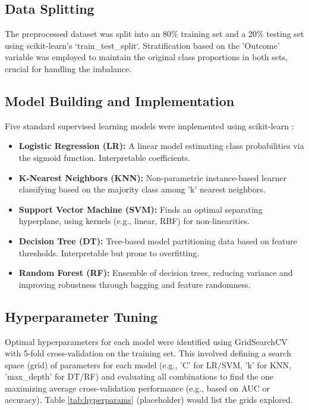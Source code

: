 \documentclass[conference]{IEEEtran}
\begin{document}
\subsection{Data Splitting}
The preprocessed dataset was split into an 80\% training set and a 20\% testing set using scikit-learn's `train_test_split`. Stratification based on the 'Outcome' variable was employed to maintain the original class proportions in both sets, crucial for handling the imbalance.

\subsection{Model Building and Implementation}
Five standard supervised learning models were implemented using scikit-learn \cite{scikit-learn}:
\begin{itemize}
    \item \textbf{Logistic Regression (LR):} A linear model estimating class probabilities via the sigmoid function. Interpretable coefficients.
    \item \textbf{K-Nearest Neighbors (KNN):} Non-parametric instance-based learner classifying based on the majority class among 'k' nearest neighbors.
    \item \textbf{Support Vector Machine (SVM):} Finds an optimal separating hyperplane, using kernels (e.g., linear, RBF) for non-linearities.
    \item \textbf{Decision Tree (DT):} Tree-based model partitioning data based on feature thresholds. Interpretable but prone to overfitting.
    \item \textbf{Random Forest (RF):} Ensemble of decision trees, reducing variance and improving robustness through bagging and feature randomness.
\end{itemize}

\subsection{Hyperparameter Tuning}
Optimal hyperparameters for each model were identified using GridSearchCV with 5-fold cross-validation on the training set. This involved defining a search space (grid) of parameters for each model (e.g., 'C' for LR/SVM, 'k' for KNN, 'max_depth' for DT/RF) and evaluating all combinations to find the one maximizing average cross-validation performance (e.g., based on AUC or accuracy). Table \ref{tab:hyperparams} (placeholder) would list the grids explored.
\end{document}
